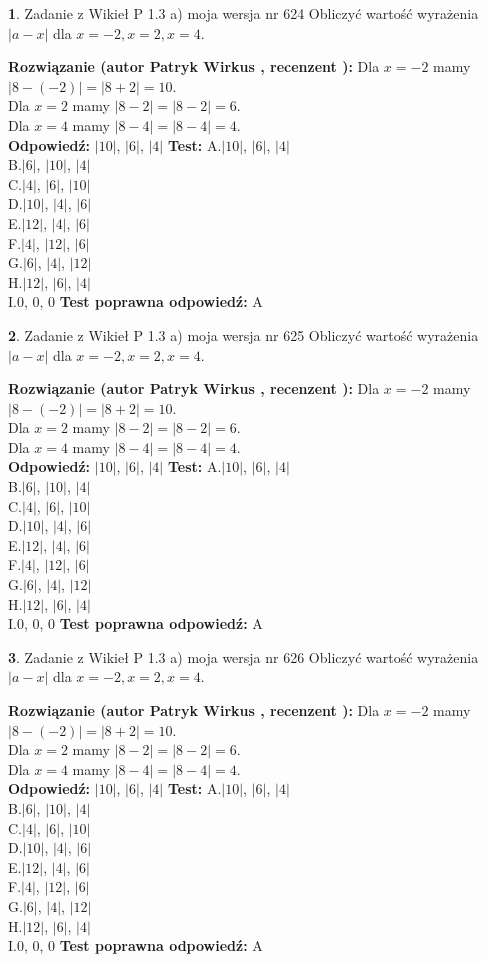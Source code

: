 \documentclass[12pt, a4paper]{article}
\theoremstyle{definition} %
\newtheorem{zad}{}
\newcommand{\zadStart}[1]{\begin{zad}#1\newline}
\newcommand{\zadStop}{\end{zad}}
\newcommand{\rozwStart}[2]{\noindent \textbf{Rozwiązanie (autor #1 , recenzent #2): }\newline}
\newcommand{\rozwStop}{\newline}
\newcommand{\odpStart}{\noindent \textbf{Odpowiedź:}\newline}
\newcommand{\odpStop}{\newline}
\newcommand{\testStart}{\noindent \textbf{Test:}\newline}
\newcommand{\testStop}{\newline}
\newcommand{\kluczStart}{\noindent \textbf{Test poprawna odpowiedź:}\newline}
\newcommand{\kluczStop}{\newline}
\begin{document}
\zadStart{Zadanie z Wikieł P 1.3 a) moja wersja nr 624}
Obliczyć wartość wyrażenia $|a - x|$ dla $x=-2,x=2,x=4$.
\zadStop
\rozwStart{Patryk Wirkus}{}
Dla $x = -2$ mamy $|8 - (-2)| = |8 + 2| = 10$.\\
Dla $x = 2$ mamy $|8 - 2| = |8 - 2| = 6$.\\
Dla $x = 4$ mamy $|8 - 4| = |8 - 4| = 4$.\\
\rozwStop
\odpStart
$|10|$, $|6|$, $|4|$
\odpStop
\testStart
A.$|10|$, $|6|$, $|4|$\\
B.$|6|$, $|10|$, $|4|$\\
C.$|4|$, $|6|$, $|10|$\\
D.$|10|$, $|4|$, $|6|$\\
E.$|12|$, $|4|$, $|6|$\\
F.$|4|$, $|12|$, $|6|$\\
G.$|6|$, $|4|$, $|12|$\\
H.$|12|$, $|6|$, $|4|$\\
I.$0$, $0$, $0$
\testStop
\kluczStart
A
\kluczStop



\zadStart{Zadanie z Wikieł P 1.3 a) moja wersja nr 625}
Obliczyć wartość wyrażenia $|a - x|$ dla $x=-2,x=2,x=4$.
\zadStop
\rozwStart{Patryk Wirkus}{}
Dla $x = -2$ mamy $|8 - (-2)| = |8 + 2| = 10$.\\
Dla $x = 2$ mamy $|8 - 2| = |8 - 2| = 6$.\\
Dla $x = 4$ mamy $|8 - 4| = |8 - 4| = 4$.\\
\rozwStop
\odpStart
$|10|$, $|6|$, $|4|$
\odpStop
\testStart
A.$|10|$, $|6|$, $|4|$\\
B.$|6|$, $|10|$, $|4|$\\
C.$|4|$, $|6|$, $|10|$\\
D.$|10|$, $|4|$, $|6|$\\
E.$|12|$, $|4|$, $|6|$\\
F.$|4|$, $|12|$, $|6|$\\
G.$|6|$, $|4|$, $|12|$\\
H.$|12|$, $|6|$, $|4|$\\
I.$0$, $0$, $0$
\testStop
\kluczStart
A
\kluczStop



\zadStart{Zadanie z Wikieł P 1.3 a) moja wersja nr 626}
Obliczyć wartość wyrażenia $|a - x|$ dla $x=-2,x=2,x=4$.
\zadStop
\rozwStart{Patryk Wirkus}{}
Dla $x = -2$ mamy $|8 - (-2)| = |8 + 2| = 10$.\\
Dla $x = 2$ mamy $|8 - 2| = |8 - 2| = 6$.\\
Dla $x = 4$ mamy $|8 - 4| = |8 - 4| = 4$.\\
\rozwStop
\odpStart
$|10|$, $|6|$, $|4|$
\odpStop
\testStart
A.$|10|$, $|6|$, $|4|$\\
B.$|6|$, $|10|$, $|4|$\\
C.$|4|$, $|6|$, $|10|$\\
D.$|10|$, $|4|$, $|6|$\\
E.$|12|$, $|4|$, $|6|$\\
F.$|4|$, $|12|$, $|6|$\\
G.$|6|$, $|4|$, $|12|$\\
H.$|12|$, $|6|$, $|4|$\\
I.$0$, $0$, $0$
\testStop
\kluczStart
A
\kluczStop
\end{document}
